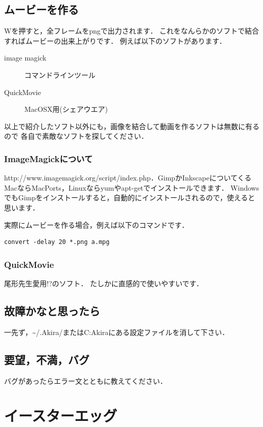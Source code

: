 \documentclass[a4j,openany]{jbook}
\begin{document}
 \section{ムービーを作る}
Wを押すと，全フレームをpngで出力されます．
これをなんらかのソフトで結合すればムービーの出来上がりです．
例えば以下のソフトがあります．
\begin{description}
 \item[image magick]
            コマンドラインツール
 \item[QuickMovie]
            MacOSX用(シェアウエア)
\end{description}
以上で紹介したソフト以外にも，画像を結合して動画を作るソフトは無数に有るので
各自で素敵なソフトを探してください．

  \subsection{ImageMagickについて}
{http://www.imagemagick.org/script/index.php}．GimpかInkscapeについてくる
MacならMacPorts，Linuxならyumやapt-getでインストールできます．
WindowsでもGimpをインストールすると，自動的にインストールされるので，使えると思います．

実際にムービーを作る場合，例えば以下のコマンドです．
   \begin{screen}
\begin{verbatim}
convert -delay 20 *.png a.mpg
\end{verbatim}
   \end{screen}

  \subsection{QuickMovie}
尾形先生愛用!?のソフト．
たしかに直感的で使いやすいです．


 \section{故障かなと思ったら}
一先ず，\~{}/.Akira/またはC:Akiraにある設定ファイルを消して下さい．

 \section{要望，不満，バグ}
バグがあったらエラー文とともに教えてください．
\appendix
\chapter{イースターエッグ}
\end{document}
